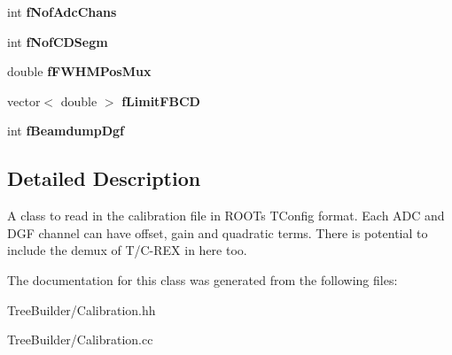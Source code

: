 \begin{DoxyCompactItemize}
int {\bfseries f\+Nof\+Adc\+Chans}
\item 
\mbox{\label{class_calibration_ab03c449889b48d77b59ddf242a68ef59}} 
int {\bfseries f\+Nof\+C\+D\+Segm}
\item 
\mbox{\label{class_calibration_a1e62c67cc989b99f6fc991deabf1641b}} 
double {\bfseries f\+F\+W\+H\+M\+Pos\+Mux}
\item 
\mbox{\label{class_calibration_a659edb01b7d8ae2a574d8513aa6c8ca4}} 
vector$<$ double $>$ {\bfseries f\+Limit\+F\+B\+CD}
\item 
\mbox{\label{class_calibration_a1fc1809a608c626d462fe7d0859d52da}} 
int {\bfseries f\+Beamdump\+Dgf}
\end{DoxyCompactItemize}


\subsection{Detailed Description}
A class to read in the calibration file in R\+O\+OT\textquotesingle{}s T\+Config format. Each A\+DC and D\+GF channel can have offset, gain and quadratic terms. There is potential to include the demux of T/\+C-\/\+R\+EX in here too. 

The documentation for this class was generated from the following files\+:\begin{DoxyCompactItemize}
\item 
Tree\+Builder/Calibration.\+hh\item 
Tree\+Builder/Calibration.\+cc\end{DoxyCompactItemize}
